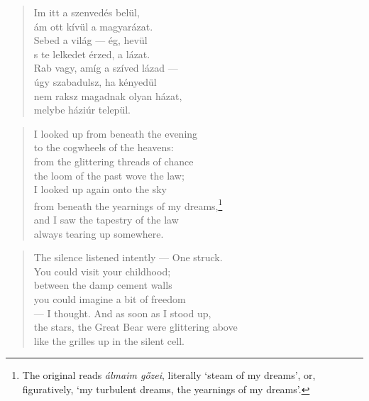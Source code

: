 \begin{verse}
  Im itt a szenvedés belül, \\
  ám ott kívül a magyarázat. \\
  Sebed a világ --- ég, hevül \\
  s te lelkedet érzed, a lázat. \\
  Rab vagy, amíg a szíved lázad --- \\
  úgy szabadulsz, ha kényedül \\
  nem raksz magadnak olyan házat, \\
  melybe háziúr települ.
\end{verse}

\newpage

\vspace*{-15mm}
\centeredornament




\begin{verse}
  I looked up from beneath the evening \\
  to the cogwheels of the heavens: \\
  from the glittering threads of chance \\
  the loom of the past wove the law; \\
  I looked up again onto the sky \\
  from beneath the yearnings of my dreams,\footnote{The
original reads \emph{álmaim gőzei}, literally `steam of my dreams',
or, figuratively, `my turbulent dreams, the yearnings of my dreams'.} \\
  and I saw the tapestry of the law \\
  always tearing up somewhere.
\end{verse}

\bigskip



\begin{verse}
  The silence listened intently --- One struck. \\
  You could visit your childhood; \\
  between the damp cement walls \\
  you could imagine a bit of freedom \\
  --- I thought. And as soon as I stood up, \\
  the stars, the Great Bear were glittering above\\
  like the grilles up in the silent cell.
\end{verse}

